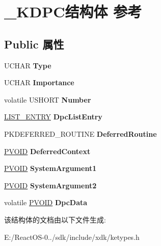 \hypertarget{struct___k_d_p_c}{}\section{\+\_\+\+K\+D\+P\+C结构体 参考}
\label{struct___k_d_p_c}
\subsection*{Public 属性}
\begin{DoxyCompactItemize}
\item 
\mbox{\label{struct___k_d_p_c_a0fabcfb6f5cc36b7355a3e2cf4c08e4c}} 
U\+C\+H\+AR {\bfseries Type}
\item 
\mbox{\label{struct___k_d_p_c_aa71047105ced3f66d95cfacfa44c03f1}} 
U\+C\+H\+AR {\bfseries Importance}
\item 
\mbox{\label{struct___k_d_p_c_ae3bf38a8fcda79f17bc51bb57f53c30e}} 
volatile U\+S\+H\+O\+RT {\bfseries Number}
\item 
\mbox{\label{struct___k_d_p_c_a2f30976599998c136d507be1e50c3885}} 
\hyperlink{struct___l_i_s_t___e_n_t_r_y}{L\+I\+S\+T\+\_\+\+E\+N\+T\+RY} {\bfseries Dpc\+List\+Entry}
\item 
\mbox{\label{struct___k_d_p_c_ac4cb93a4f4f214df39d3d3ea0a059c20}} 
P\+K\+D\+E\+F\+E\+R\+R\+E\+D\+\_\+\+R\+O\+U\+T\+I\+NE {\bfseries Deferred\+Routine}
\item 
\mbox{\label{struct___k_d_p_c_afab58e439f0c087f117efcec61af8b60}} 
\hyperlink{interfacevoid}{P\+V\+O\+ID} {\bfseries Deferred\+Context}
\item 
\mbox{\label{struct___k_d_p_c_aad04a98483f7ee23d3560ad57b84be45}} 
\hyperlink{interfacevoid}{P\+V\+O\+ID} {\bfseries System\+Argument1}
\item 
\mbox{\label{struct___k_d_p_c_aa10961cb876bc31336d39bcf0162a0fa}} 
\hyperlink{interfacevoid}{P\+V\+O\+ID} {\bfseries System\+Argument2}
\item 
\mbox{\label{struct___k_d_p_c_acfc2d60a2347b9ea4823ec48399390ee}} 
volatile \hyperlink{interfacevoid}{P\+V\+O\+ID} {\bfseries Dpc\+Data}
\end{DoxyCompactItemize}


该结构体的文档由以下文件生成\+:\begin{DoxyCompactItemize}
\item 
E\+:/\+React\+O\+S-\/0../sdk/include/xdk/ketypes.\+h\end{DoxyCompactItemize}
